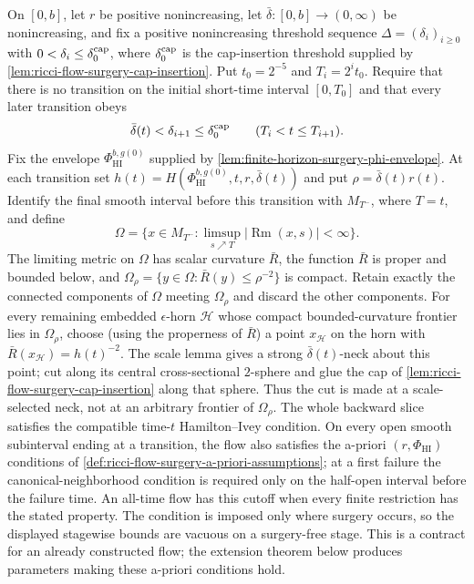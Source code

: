 \begin{definition}
\label{def:ricci-flow-with-cutoff}
\notready
On $[0,b]$, let $r$ be positive nonincreasing, let
$\bar\delta:[0,b]\to(0,\infty)$ be nonincreasing, and fix a positive
nonincreasing threshold sequence
$\Delta=(\delta_i)_{i\ge0}$ with $0<\delta_i\le\delta_0^{\rm cap}$, where
$\delta_0^{\rm cap}$ is the cap-insertion threshold supplied by
\ref{lem:ricci-flow-surgery-cap-insertion}.  Put
$t_0=2^{-5}$ and $T_i=2^it_0$.  Require that there is no transition on the
initial short-time interval $[0,T_0]$ and that every later transition obeys
\[
\bar\delta(t)<\delta_{i+1}\le\delta_0^{\rm cap}
 \qquad(T_i<t\le T_{i+1}).
\]
Fix the envelope $\Phi_{\mathrm{HI}}^{b,g(0)}$ supplied by
\ref{lem:finite-horizon-surgery-phi-envelope}.  At each transition set
$h(t)=H(\Phi_{\mathrm{HI}}^{b,g(0)},t,r,\bar\delta(t))$ and put
$\rho=\bar\delta(t)r(t)$.  Identify the final smooth interval before this
transition with $M_{T^-}$, where $T=t$, and define
\[
 \Omega=\{x\in M_{T^-}:\limsup_{s\nearrow T}|\operatorname{Rm}(x,s)|<\infty\}.
\]
The limiting metric on $\Omega$ has scalar curvature $\bar R$, the function
$\bar R$ is proper and bounded below, and
$\Omega_\rho=\{y\in\Omega:\bar R(y)\le\rho^{-2}\}$ is compact.  Retain
exactly the connected components of $\Omega$ meeting $\Omega_\rho$ and discard
the other components.  For every remaining embedded $\epsilon$-horn $\mathcal H$
whose compact bounded-curvature frontier lies in $\Omega_\rho$, choose (using
the properness of $\bar R$) a point $x_{\mathcal H}$ on the horn with
$\bar R(x_{\mathcal H})=h(t)^{-2}$.  The scale lemma gives a strong
$\bar\delta(t)$-neck about this point; cut along its central cross-sectional
$2$-sphere and glue the cap of
\ref{lem:ricci-flow-surgery-cap-insertion} along that sphere.  Thus the cut
is made at a scale-selected neck, not at an arbitrary frontier of
$\Omega_\rho$.  The whole backward slice satisfies the compatible time-$t$
Hamilton--Ivey condition.  On every open smooth subinterval ending at
a transition, the flow also satisfies the a-priori $(r,\Phi_{\mathrm{HI}})$
conditions of
\ref{def:ricci-flow-surgery-a-priori-assumptions}; at a first failure the
canonical-neighborhood condition is required only on the half-open interval
before the failure time.  An all-time flow has this cutoff when every finite
restriction has the stated property.  The condition is imposed only where
surgery occurs, so the displayed stagewise bounds are vacuous on a
surgery-free stage.  This is a contract for an already constructed flow;
the extension theorem below produces parameters making these a-priori
conditions hold.
\end{definition}

